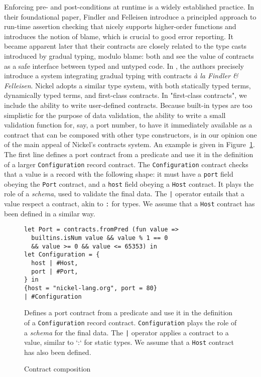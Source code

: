 Enforcing pre- and post-conditions at runtime is a widely established practice.
In their foundational paper\cite{FindlerFelleisenHOContracts}, Findler and
Felleisen introduce a principled approach to run-time assertion checking that
nicely supports higher-order functions and introduces the notion of blame, which
is crucial to good error reporting. It became apparent later that their
contracts are closely related to the type casts introduced by gradual typing,
modulo blame: both \cite{FindlerMultiLang} and \cite{FelleisenInterLang} see the
value of contracts as a safe interface between typed and untyped code. In
\cite{WellTypedBlamed}, the authors precisely introduce a system integrating
gradual typing with contracts \textit{à la Findler \& Felleisen}. Nickel
adopts a similar type system, with both statically typed terms, dynamically
typed terms, and first-class contracts. In "first-class contracts", we include
the ability to write user-defined contracts. Because built-in types are too
simplistic for the purpose of data validation, the ability to write a small
validation function for, say, a port number, to have it immediately available as
a contract that can be composed with other type constructors, is in our opinion one of the main appeal of Nickel's contracts
system. An example is given in Figure~\ref{fig:contract-composition-appendix}. The first
line defines a port contract from a predicate and use it in the definition of a
larger \lstinline+Configuration+ record contract. The \lstinline+Configuration+
contract checks that a value is a record with the following shape: it must have
a \lstinline+port+ field obeying the \lstinline+Port+ contract, and a
\lstinline+host+ field obeying a \lstinline+Host+ contract. It plays the role of
a \emph{schema}, used to validate the final data. The \lstinline+|+ operator
entails that a value respect a contract, akin to \lstinline+:+ for types. We
assume that a \lstinline+Host+ contract has been defined in a similar way.

\begin{figure}
  \begin{center}
\begin{lstlisting}[language=nickel]
let Port = contracts.fromPred (fun value =>
  builtins.isNum value && value % 1 == 0
  && value >= 0 && value <= 65353) in
let Configuration = {
  host | #Host,
  port | #Port,
} in
{host = "nickel-lang.org", port = 80}
| #Configuration
\end{lstlisting}
  \end{center}
\caption{Contract composition}
\label{fig:contract-composition-appendix}
\medskip
\small
Defines a port contract from a predicate and use it in the definition of a
\lstinline+Configuration+ record contract. \lstinline+Configuration+ plays the
role of a \emph{schema} for the final data. The \lstinline+|+ operator applies a
contract to a value, similar to `:` for static types. We assume that a
\lstinline+Host+ contract has also been defined.
\end{figure}

